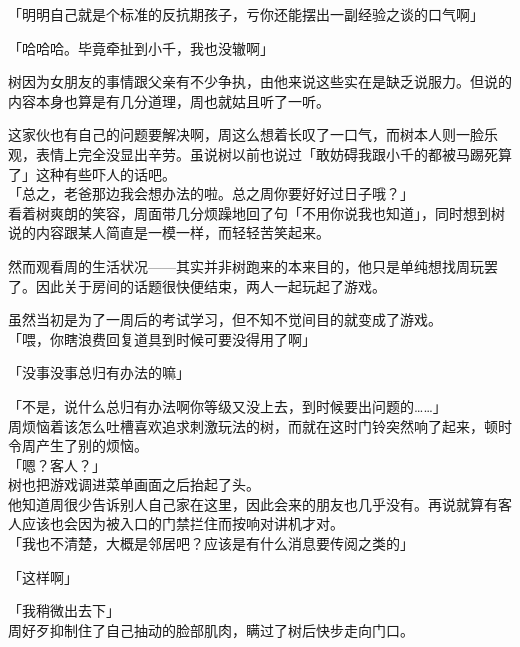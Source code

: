「明明自己就是个标准的反抗期孩子，亏你还能摆出一副经验之谈的口气啊」

「哈哈哈。毕竟牵扯到小千，我也没辙啊」

树因为女朋友的事情跟父亲有不少争执，由他来说这些实在是缺乏说服力。但说的内容本身也算是有几分道理，周也就姑且听了一听。

这家伙也有自己的问题要解决啊，周这么想着长叹了一口气，而树本人则一脸乐观，表情上完全没显出辛劳。虽说树以前也说过「敢妨碍我跟小千的都被马踢死算了」这种有些吓人的话吧。\\

「总之，老爸那边我会想办法的啦。总之周你要好好过日子哦？」\\

看着树爽朗的笑容，周面带几分烦躁地回了句「不用你说我也知道」，同时想到树说的内容跟某人简直是一模一样，而轻轻苦笑起来。\\

\vspace{2\baselineskip}

然而观看周的生活状况——其实并非树跑来的本来目的，他只是单纯想找周玩罢了。因此关于房间的话题很快便结束，两人一起玩起了游戏。

虽然当初是为了一周后的考试学习，但不知不觉间目的就变成了游戏。\\

「喂，你瞎浪费回复道具到时候可要没得用了啊」

「没事没事总归有办法的嘛」

「不是，说什么总归有办法啊你等级又没上去，到时候要出问题的……」\\

周烦恼着该怎么吐槽喜欢追求刺激玩法的树，而就在这时门铃突然响了起来，顿时令周产生了别的烦恼。\\

「嗯？客人？」\\

树也把游戏调进菜单画面之后抬起了头。\\

他知道周很少告诉别人自己家在这里，因此会来的朋友也几乎没有。再说就算有客人应该也会因为被入口的门禁拦住而按响对讲机才对。\\

「我也不清楚，大概是邻居吧？应该是有什么消息要传阅之类的」

「这样啊」

「我稍微出去下」\\

周好歹抑制住了自己抽动的脸部肌肉，瞒过了树后快步走向门口。\\

